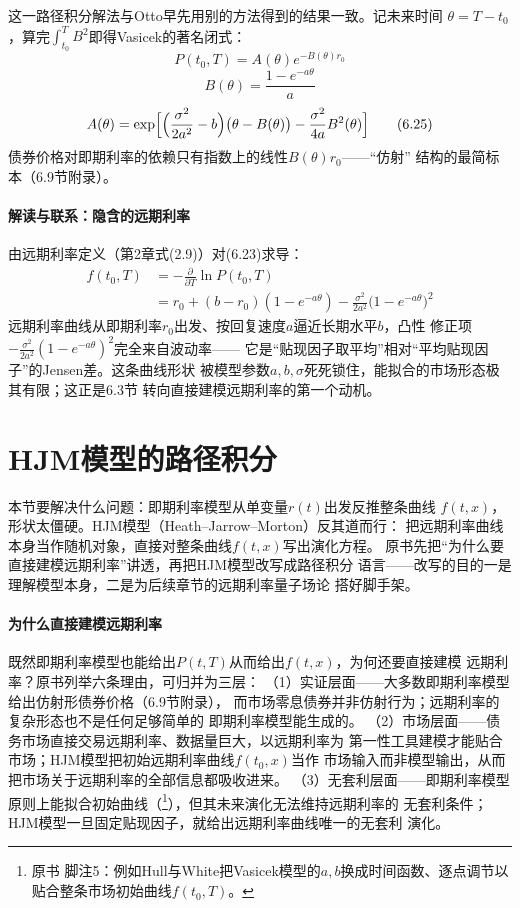 这一路径积分解法与Otto早先用别的方法得到的结果一致。记未来时间
$\theta=T-t_0$，算完$\int_{t_0}^{T}B^2$即得Vasicek的著名闭式：
\begin{equation*}
P(t_0,T)=A(\theta)e^{-B(\theta)r_0}
\tag{6.23}
\end{equation*}
\begin{equation*}
B(\theta)=\frac{1-e^{-a\theta}}{a}
\tag{6.24}
\end{equation*}
\begin{equation*}
A(\theta)=\exp\Bigl[\Bigl(\frac{\sigma^2}{2a^2}-b\Bigr)
\bigl(\theta-B(\theta)\bigr)-\frac{\sigma^2}{4a}B^2(\theta)\Bigr]
\tag{6.25}
\end{equation*}
债券价格对即期利率的依赖只有指数上的线性$B(\theta)r_0$——“仿射”
结构的最简标本（6.9节附录）。

\paragraph{解读与联系：隐含的远期利率}
由远期利率定义（第2章式(2.9)）对(6.23)求导：
\begin{align*}
f(t_0,T)&=-\frac{\partial}{\partial T}\ln P(t_0,T)
\tag{6.26}\\
&=r_0+(b-r_0)(1-e^{-a\theta})-\frac{\sigma^2}{2a^2}
\bigl(1-e^{-a\theta}\bigr)^2
\tag{6.27}
\end{align*}
远期利率曲线从即期利率$r_0$出发、按回复速度$a$逼近长期水平$b$，凸性
修正项$-\frac{\sigma^2}{2a^2}(1-e^{-a\theta})^2$完全来自波动率——
它是“贴现因子取平均”相对“平均贴现因子”的Jensen差。这条曲线形状
被模型参数$a,b,\sigma$死死锁住，能拟合的市场形态极其有限；这正是6.3节
转向直接建模远期利率的第一个动机。

\section{HJM模型的路径积分}

本节要解决什么问题：即期利率模型从单变量$r(t)$出发反推整条曲线
$f(t,x)$，形状太僵硬。HJM模型（Heath--Jarrow--Morton）反其道而行：
把远期利率曲线本身当作随机对象，直接对整条曲线$f(t,x)$写出演化方程。
原书先把“为什么要直接建模远期利率”讲透，再把HJM模型改写成路径积分
语言——改写的目的一是理解模型本身，二是为后续章节的远期利率量子场论
搭好脚手架。

\paragraph{为什么直接建模远期利率}
既然即期利率模型也能给出$P(t,T)$从而给出$f(t,x)$，为何还要直接建模
远期利率？原书列举六条理由，可归并为三层：
（1）实证层面——大多数即期利率模型给出仿射形债券价格（6.9节附录），
而市场零息债券并非仿射行为；远期利率的复杂形态也不是任何足够简单的
即期利率模型能生成的。
（2）市场层面——债务市场直接交易远期利率、数据量巨大，以远期利率为
第一性工具建模才能贴合市场；HJM模型把初始远期利率曲线$f(t_0,x)$当作
市场输入而非模型输出，从而把市场关于远期利率的全部信息都吸收进来。
（3）无套利层面——即期利率模型原则上能拟合初始曲线（\footnote{原书
脚注5：例如Hull与White把Vasicek模型的$a,b$换成时间函数、逐点调节以
贴合整条市场初始曲线$f(t_0,T)$。}），但其未来演化无法维持远期利率的
无套利条件；HJM模型一旦固定贴现因子，就给出远期利率曲线唯一的无套利
演化。

